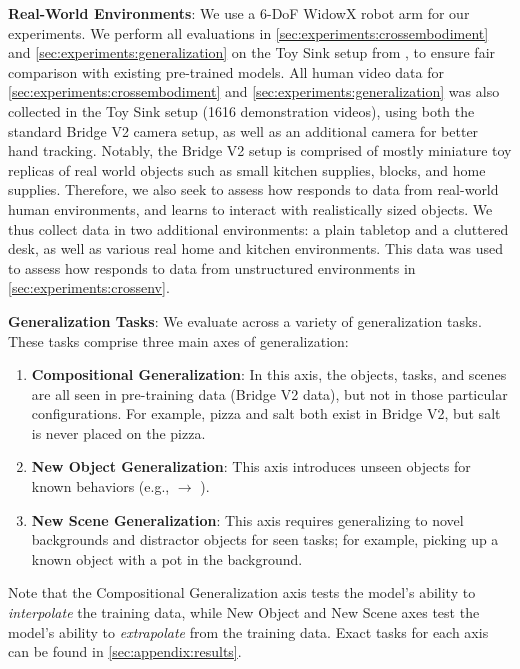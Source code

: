 \smallskip \noindent \textbf{Real-World Environments}: We use a 6-DoF WidowX robot arm for our experiments. We perform all evaluations in \cref{sec:experiments:crossembodiment} and \cref{sec:experiments:generalization} on the Toy Sink setup from \cite{walke2023bridgedata}, to ensure fair comparison with existing pre-trained models. All human video data for \cref{sec:experiments:crossembodiment} and \cref{sec:experiments:generalization} was also collected in the Toy Sink setup (1616 demonstration videos), using both the standard Bridge V2 camera setup, as well as an additional camera for better hand tracking. Notably, the Bridge V2 setup is comprised of mostly miniature toy replicas of real world objects such as small kitchen supplies, blocks, and home supplies. Therefore, we also seek to assess how \ACRO responds to data from real-world human environments, and learns to interact with realistically sized objects. We thus collect data in two additional environments: a plain tabletop and a cluttered desk, as well as various real home and kitchen environments. This data was used to assess how \ACRO responds to data from unstructured environments in \cref{sec:experiments:crossenv}. 




\smallskip \noindent \textbf{Generalization Tasks}: We evaluate \ACRO across a variety of generalization tasks. These tasks comprise three main axes of generalization:
\begin{enumerate}
    \item \textbf{Compositional Generalization}: In this axis, the objects, tasks, and scenes are all seen in pre-training data (Bridge V2 data), but not in those particular configurations. For example, pizza and salt both exist in Bridge V2, but salt is never placed on the pizza.
    \item \textbf{New Object Generalization}: This axis introduces unseen objects for known behaviors (e.g.,  $\to$ ).
    \item \textbf{New Scene Generalization}: This axis requires generalizing to novel backgrounds and distractor objects for seen tasks; for example, picking up a known object with a pot in the background.
\end{enumerate}

Note that the Compositional Generalization axis tests the model's ability to \emph{interpolate} the training data, while New Object and New Scene axes test the model's ability to \emph{extrapolate} from the training data. Exact tasks for each axis can be found in \cref{sec:appendix:results}.

